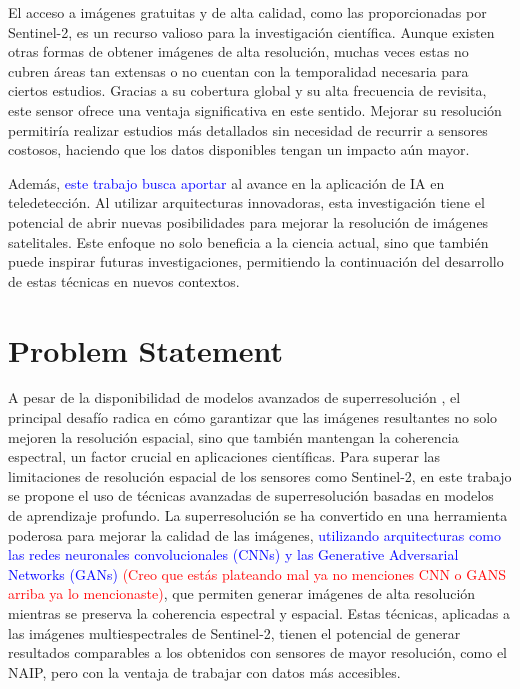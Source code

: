 El acceso a imágenes gratuitas y de alta calidad, como las proporcionadas por Sentinel-2, es un recurso valioso para la investigación científica. Aunque existen otras formas de obtener imágenes de alta resolución, muchas veces estas no cubren áreas tan extensas o no cuentan con la temporalidad necesaria para ciertos estudios. Gracias a su cobertura global y su alta frecuencia de revisita, este sensor ofrece una ventaja significativa en este sentido. Mejorar su resolución permitiría realizar estudios más detallados sin necesidad de recurrir a sensores costosos, haciendo que los datos disponibles tengan un impacto aún mayor.

Además, \textcolor{blue}{este trabajo busca aportar} al avance en la aplicación de IA en teledetección. Al utilizar arquitecturas innovadoras, esta investigación tiene el potencial de abrir nuevas posibilidades para mejorar la resolución de imágenes satelitales. Este enfoque no solo beneficia a la ciencia actual, sino que también puede inspirar futuras investigaciones, permitiendo la continuación del desarrollo de estas técnicas en nuevos contextos.


\section{Problem Statement}


A pesar de la disponibilidad de modelos avanzados de superresolución \autocite{salgueiro2020super, navarro_sánchez_2020}, el principal desafío radica en cómo garantizar que las imágenes resultantes no solo mejoren la resolución espacial, sino que también mantengan la coherencia espectral, un factor crucial en aplicaciones científicas. Para superar las limitaciones de resolución espacial de los sensores como Sentinel-2, en este trabajo se propone el uso de técnicas avanzadas de superresolución basadas en modelos de aprendizaje profundo. La superresolución se ha convertido en una herramienta poderosa para mejorar la calidad de las imágenes, \textcolor{blue}{ utilizando arquitecturas como las redes neuronales convolucionales (CNNs) y las Generative Adversarial Networks (GANs)} \textcolor{red}{(Creo que estás plateando mal ya no menciones CNN o GANS arriba ya lo mencionaste)}, que permiten generar imágenes de alta resolución mientras se preserva la coherencia espectral y espacial. Estas técnicas, aplicadas a las imágenes multiespectrales de Sentinel-2, tienen el potencial de generar resultados comparables a los obtenidos con sensores de mayor resolución, como el NAIP, pero con la ventaja de trabajar con datos más accesibles.

